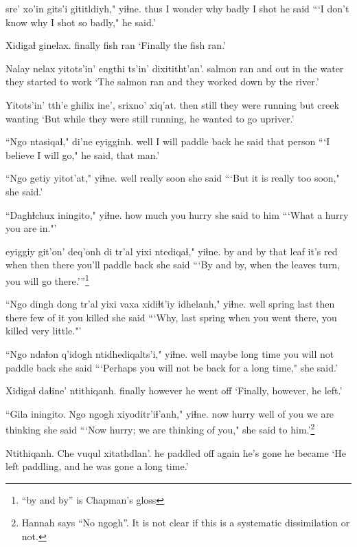 \documentclass[12pt]{article}
\begin{document}
 sre' xo'in gits'i  gititldiyh," yiɬne.
thus {I wonder} why badly  {I shot}  {he said}
\glt ```I don't know why I shot so badly," he said.'
\glend 

\gll Xidigaɬ ginelax.
finally  {fish ran}
\glt `Finally the fish ran.'
\glend 

\gll Nalay  nelax yitots'in' {engthi ts'in'} dixititht'an'.
salmon  ran and  {out in the water} {they started to work}
\glt `The salmon ran and they worked down by the river.'
\glend 

\gll Yitots'in' tth'e ghilix   ine', srixno' xiq'at.
then  still {they were running} but creek  wanting
\glt `But while they were still running, he wanted to go upriver.'
\glend 

\gll ``Ngo ntasiqaɬ," di'ne eyigginh.
well {I will paddle back} {he said} {that person}
\glt ```I believe I will go," he said, that man.'
\glend 

\gll ``Ngo getiy yitot'at," yiɬne.
well really soon {she said}
\glt ```But it is really too soon," she said.'
\glend 

\gll ``Daghɬchux iningito," yiɬne.
{how much} {you hurry} {she said to him}
\glt ```What a hurry you are in."'
\glend 

 eyiggiy git'on'  deq'onh di tr'al yixi ntediqaɬ," yiɬne.
{by and by}  that  leaf  {it's red} when then there {you'll paddle back} {she said}
\glt ```By and by, when the leaves turn, you will go there.'''\footnote{``by and by'' is Chapman's gloss}
\glend 

\gll ``Ngo dingh  dong tr'al yixi {vaxa xidiɬt'iy} idhelanh," yiɬne.
well spring  last then there {few of it}   {you killed} {she said}
\glt ```Why, last spring when you went there, you killed very little."'
\glend 

\gll ``Ngo ndaɬon q'idogh  ntidhediqalts'i," yiɬne.
well maybe  {long time}  {you will not paddle back} {she said}
\glt ```Perhaps you will not be back for a long time," she said.'
\glend 

\gll Xidigaɬ daɬine' ntithiqanh.
finally  however {he went off}
\glt `Finally, however, he left.'
\glend 

\gll ``Gila iningito. Ngo ngogh  xiyoditr'iɬ'anh," yiɬne.
now hurry  well {of you} {we are thinking} {she said}
\glt ```Now hurry; we are thinking of you," she said to him.'\footnote{Hannah says ``No ngogh''.  It is not clear if this is a systematic dissimilation or not.}
\glend 

\gll Ntithiqanh.  Che vuqul  xitathdlan'.
{he paddled off} again {he's gone} {he became}
\glt `He left paddling, and he was gone a long time.'
\glend 
\end{document}
